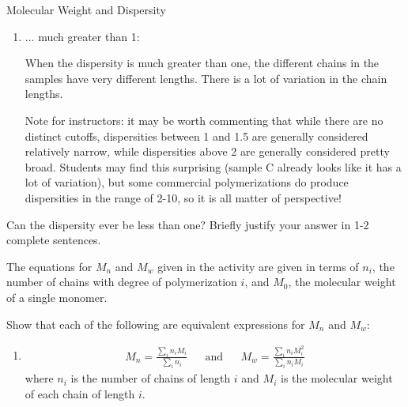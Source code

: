 \begin{activity}{Molecular Weight and Dispersity}
\begin{ctqs}
\begin{enumerate}
			\item ... much greater than 1:
			
				\begin{solution}[1in]
					When the dispersity is much greater than one, the different chains in the samples have very different lengths.  There is a lot of variation in the chain lengths.
					
					Note for instructors: it may be worth commenting that while there are no distinct cutoffs, dispersities between 1 and 1.5 are generally considered relatively narrow, while dispersities above 2 are generally considered pretty broad.  Students may find this surprising (sample C already looks like it has a lot of variation), but some commercial polymerizations do produce dispersities in the range of 2-10, so it is all matter of perspective!
				\end{solution}
			
		\end{enumerate}
		
	\question Can the dispersity ever be less than one?  Briefly justify your answer in 1-2 complete sentences.
	
		\begin{solution}[2in]\studentdisplay{~}
		\end{solution}
	
\end{ctqs}



\begin{exercises}

		\exercise The equations for $M_n$ and $M_w$ given in the activity are given in terms of $n_i$, the number of chains with degree of polymerization $i$, and $M_0$, the molecular weight of a single monomer.
		
		Show that each of the following are equivalent expressions for $M_n$ and $M_w$:
		
			\begin{enumerate}
				
				\item \begin{align*}
					M_n = \frac{\sum_i n_i M_i}{\sum_i n_i} && \text{and} &&  M_w = \frac{\sum_i n_i M_i^2}{\sum_i n_i M_i}
				\end{align*}
					where $n_i$ is the number of chains of length $i$ and $M_i$ is the molecular weight of each chain of length $i$.
					

\end{enumerate}
\end{exercises}
\end{activity}
